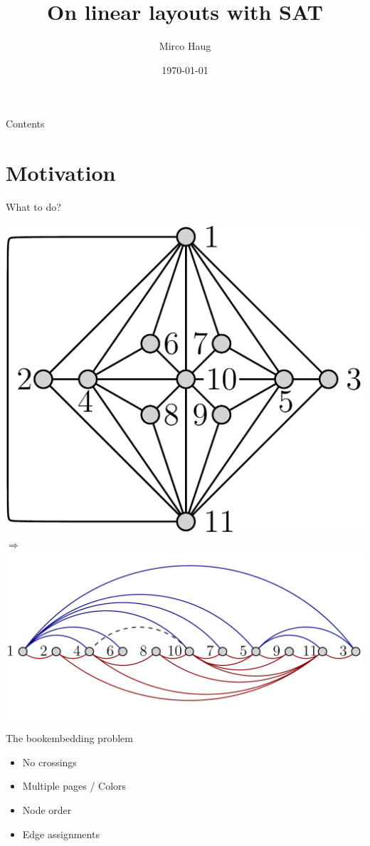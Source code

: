 \documentclass[11pt]{beamer}
\begin{document}
    \author{Mirco Haug}
    \title{On linear layouts with SAT}
    \date{\today}
    \begin{frame}
        \maketitle
    \end{frame}

    \begin{frame}{Contents}
        \tableofcontents
    \end{frame}

    \section{Motivation}\label{sec:motivation}

    \begin{frame}{What to do?}
        \begin{center}
            \includegraphics[width=0.4\linewidth,valign=c]{../_static/graphs/gh.png} $\Rightarrow$
            \includegraphics[width=0.54\linewidth,valign=c]{../_static/graphs/gh_stack.png}
        \end{center}
    \end{frame}

    \begin{frame}{The bookembedding problem}
        \begin{itemize}
            \item No crossings
            \item Multiple pages / Colors
            \item Node order
            \item Edge assignments
        \end{itemize}
    \end{frame}
\end{document}
